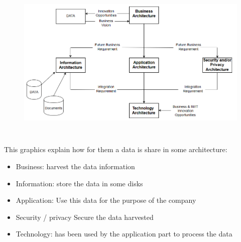 \documentclass[12pt]{report}
\begin{document}

\begin{figure}[H]
	\begin{Center}
		\includegraphics[width=6.56in,height=3.04in]{./media/image8.png}
	\end{Center}
\end{figure}



This graphics explain how for them a data is share in some architecture:   \par

\begin{itemize}
	\item Business: harvest the data information\par

	\item Information: store the data in some disks\par

	\item Application: Use this data for the purpose of the company \par

	\item Security / privacy  Secure the data harvested\par

	\item Technology: has been used by the application part to process the data \par
\end{itemize}\par



\end{document}
